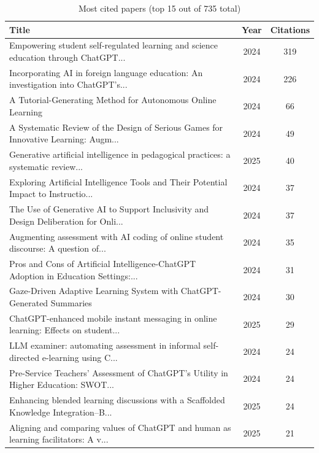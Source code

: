 \begin{table}[htbp]
\centering
\caption{Most cited papers (top 15 out of 735 total)}
\label{tab:most_cited}
\begin{tabular}{p{9cm}cc}
\toprule
Title & Year & Citations \\
\midrule
\rowcolor{white}
Empowering student self-regulated learning and science education through ChatGPT... & 2024 & 319 \\
\rowcolor{gray!15}
Incorporating AI in foreign language education: An investigation into ChatGPT’s... & 2024 & 226 \\
\rowcolor{white}
A Tutorial-Generating Method for Autonomous Online Learning & 2024 & 66 \\
\rowcolor{gray!15}
A Systematic Review of the Design of Serious Games for Innovative Learning: Augm... & 2024 & 49 \\
\rowcolor{white}
Generative artificial intelligence in pedagogical practices: a systematic review... & 2025 & 40 \\
\rowcolor{gray!15}
Exploring Artificial Intelligence Tools and Their Potential Impact to Instructio... & 2024 & 37 \\
\rowcolor{white}
The Use of Generative AI to Support Inclusivity and Design Deliberation for Onli... & 2024 & 37 \\
\rowcolor{gray!15}
Augmenting assessment with AI coding of online student discourse: A question of... & 2024 & 35 \\
\rowcolor{white}
Pros and Cons of Artificial Intelligence-ChatGPT Adoption in Education Settings:... & 2024 & 31 \\
\rowcolor{gray!15}
Gaze-Driven Adaptive Learning System with ChatGPT-Generated Summaries & 2024 & 30 \\
\rowcolor{white}
ChatGPT-enhanced mobile instant messaging in online learning: Effects on student... & 2025 & 29 \\
\rowcolor{gray!15}
LLM examiner: automating assessment in informal self-directed e-learning using C... & 2024 & 24 \\
\rowcolor{white}
Pre-Service Teachers’ Assessment of ChatGPT’s Utility in Higher Education: SWOT... & 2024 & 24 \\
\rowcolor{gray!15}
Enhancing blended learning discussions with a Scaffolded Knowledge Integration–B... & 2025 & 24 \\
\rowcolor{white}
Aligning and comparing values of ChatGPT and human as learning facilitators: A v... & 2025 & 21 \\
\bottomrule
\end{tabular}
\end{table}